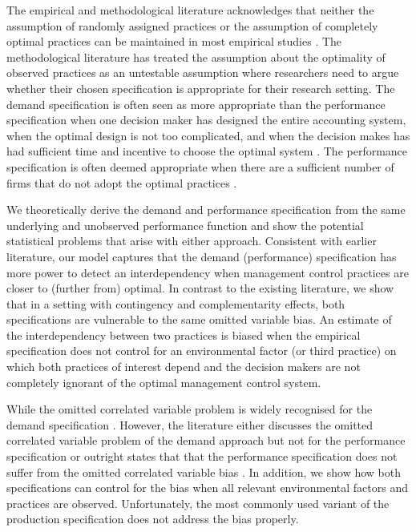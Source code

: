 \documentclass[12pt]{article}
\begin{document}
The empirical and methodological literature acknowledges that neither the assumption of randomly assigned practices or the assumption of completely optimal practices can be maintained in most empirical studies \citep{Brynjolfsson2013ComplementarityOrganizations}. The methodological literature has treated the assumption about the optimality of observed practices as an untestable assumption where researchers need to argue whether their chosen specification is appropriate for their research setting. The demand specification is often seen as more appropriate than the performance specification when one decision maker has designed the entire accounting system, when the optimal design is not too complicated, and when the decision makes has had sufficient time and incentive to choose the optimal system \citep{Grabner2013, Hofmann2015OrganizationalChoices, Carree2011, Johansson2018}.  The performance specification is often deemed appropriate when there are a sufficient number of firms that do not adopt the optimal practices \citep{Carree2011, Bedford2016}. 

We theoretically derive the demand and performance specification from the same underlying and unobserved performance function and show the potential statistical problems that arise with either approach. Consistent with earlier literature, our model captures that the demand (performance) specification has more power to detect an interdependency when management control practices are closer to (further from) optimal. In contrast to the existing literature, we show that in a setting with contingency and complementarity effects, both specifications are vulnerable to the same omitted variable bias. An estimate of the interdependency between two practices is biased when the empirical specification does not control for an environmental factor (or third practice) on which both practices of interest depend and the decision makers are not completely ignorant of the optimal management control system. 

 While the omitted correlated variable problem is widely recognised for the demand specification \citep{Grabner2013, Arora1996,Hofmann2015OrganizationalChoices}. However, the literature either discusses the omitted correlated variable problem of the demand approach but not for the performance specification \citep{Grabner2013,Hofmann2015OrganizationalChoices} or outright states that that the performance specification does not suffer from the omitted correlated variable bias \citep{Carree2011}.  In addition, we show how both specifications can control for the bias when all relevant environmental factors and practices are observed. Unfortunately, the most commonly used variant of the production specification does not address the bias properly.
\end{document}
